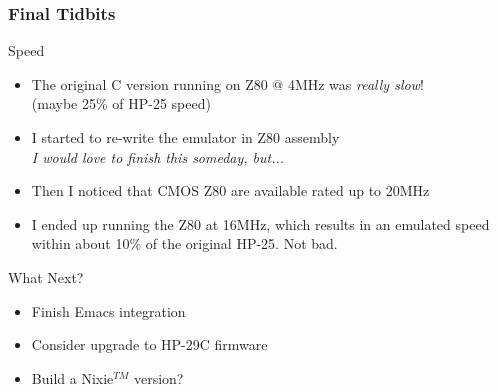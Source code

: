 \documentclass{beamer}
\newcommand{\tgreen}[1]{\textcolor{my-green}{#1}}
\newcommand{\tviolet}[1]{\textcolor{my-violet}{#1}}
\begin{document}
\begin{frame}
  \frametitle{Final Tidbits}

  \tgreen{Speed}
  \begin{itemize}
  \scriptsize
  \item The original C version running on Z80 @ 4MHz was {\em really slow}! \\
  (maybe 25\% of HP-25 speed)
  \item I started to re-write the emulator in Z80 assembly \\
  {\em I would love to finish this someday, but...}
  \item Then I noticed that CMOS Z80 are available rated up to 20MHz
  \item I ended up running the Z80 at 16MHz, which results in an
  emulated speed within about 10\% of the original HP-25.  Not bad.
  \end{itemize}

  \vskip 0.2in
  
  \tviolet{What Next?}
  \scriptsize
  \begin{itemize}
  \item Finish Emacs integration
  \item Consider upgrade to HP-29C firmware
  \item Build a Nixie$^{TM}$ version?
  \end{itemize}

\end{frame}
\end{document}
